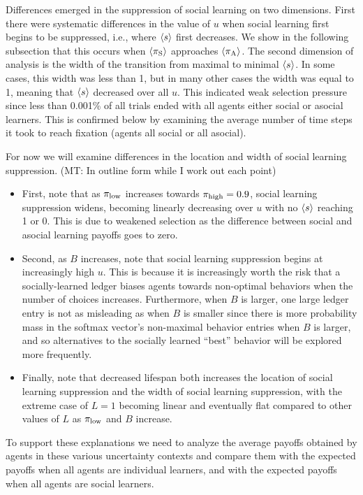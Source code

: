 \documentclass[letterpaper,11.5pt]{scrartcl}
\newcommand{\mt}[1]{{\textcolor{myorange} {({\tiny MT:} #1)}}}
\begin{document}
Differences emerged in the suppression of social learning on two dimensions.
First there were systematic differences in the value of $u$ when social
learning first begins to be suppressed, i.e., where $\langle s \rangle$ first decreases. We show
in the following subsection that this occurs when $\langle \pi_\mathrm{S} \rangle$ approaches $\langle \pi_\mathrm{A} \rangle$.
The second dimension of analysis is the width of the transition from 
maximal to minimal $\langle s \rangle$. In some cases, this width was less than 1, but
in many other cases the width was equal to 1, meaning that $\langle s \rangle$ 
decreased over all $u$. This indicated weak selection pressure since 
less than 0.001\% of all trials ended with all agents either social or asocial
learners. This is confirmed below by examining the average number of time steps
it took to reach fixation (agents all social or all asocial).

For now we will examine differences in the location and width of social 
learning suppression. \mt{In outline form while I work out each point}
\begin{itemize}
  \item 
    First, note that as $\pi_{\mathrm{low}}$ increases towards $\pi_{\mathrm{high}} = 0.9$, social learning
    suppression widens, becoming linearly decreasing over $u$ with no $\langle s \rangle$
    reaching 1 or 0. This is due to weakened selection as the difference between
    social and asocial learning payoffs goes to zero.
  \item
    Second, as $B$ increases, note that social learning suppression 
    begins at increasingly high $u$. This is because it is increasingly worth
    the risk that a socially-learned ledger biases agents towards non-optimal
    behaviors when the number of choices increases. Furthermore, when $B$ is
    larger, one large ledger entry is not as misleading as when $B$ is smaller
    since there is more probability mass in the softmax vector's non-maximal
    behavior entries when $B$ is larger, and so alternatives to the socially
    learned ``best'' behavior will be explored more frequently.
  \item
    Finally, note that decreased lifespan both increases the location of 
    social learning suppression and the width of social learning suppression,
    with the extreme case of $L=1$ becoming linear and eventually flat compared
    to other values of $L$ as $\pi_{\mathrm{low}}$ and $B$ increase.
\end{itemize}
To support these explanations we need to analyze the average payoffs 
obtained by agents in these various uncertainty contexts and compare them
with the expected payoffs when all agents are individual learners, and with the
expected payoffs when all agents are social learners.
\end{document}
